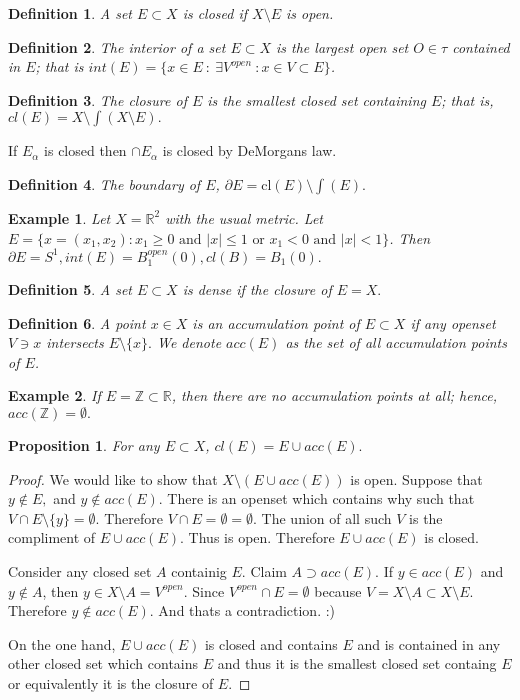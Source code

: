 \documentclass[letter]{article}
\newtheorem{example}{Example}
\newtheorem{definition}{Definition}
\newtheorem{proposition}{Proposition}
\def\cl{\text{cl}}
\begin{document}
\begin{definition}
	A set $E \subset X$ is closed if $X \setminus E$ is open.
\end{definition}
\begin{definition}
	The interior of a set $E \subset X$ is the largest open set $O \in \tau$ contained in $E$;
	that is $int(E) = \{x \in E\ :\ \exists V^{open}\ : x \in V \subset E\}$.
\end{definition}
\begin{definition}
	The closure of $E$ is the smallest closed set containing $E$; that is,
	$cl(E) = X \setminus \int(X \setminus E).$
\end{definition}
If $E_\alpha$ is closed then $\cap E_\alpha $ is closed by DeMorgans law.
\begin{definition}
	The boundary of $E$, $\partial E = \cl(E) \setminus \int(E).$
\end{definition}
\begin{example}
	Let $X = \mathbb{R}^2$ with the usual metric. Let $E = \{x = (x_1, x_2): x_1 \geq 0 \text{ and } |x| \leq 1 \text{ or } x_1 < 0 \text{ and } |x| < 1 \}$. Then $\partial E = S^1, int(E) = B^{open}_1(0), cl(B) = B_1(0).$
\end{example}
\begin{definition}
	A set $E \subset X$ is dense if the closure of $E = X.$
\end{definition}
\begin{definition}
	A point $x \in X$ is an accumulation point of $E \subset X$ if any openset $V \ni x$
	intersects $E \setminus \{x\}.$ We denote $acc(E)$ as the set of all accumulation points of $E$.
\end{definition}
\begin{example}
 If $E = \mathbb{Z} \subset \mathbb{R}$, then there are no accumulation points at all; hence, $acc(\mathbb{Z}) = \emptyset.$
\end{example}
\begin{proposition}
	For any $E \subset X$, $cl(E) = E \cup acc(E).$
\end{proposition}
\begin{proof}
	We would like to show that $X \setminus (E \cup acc(E))$ is open.
	Suppose that $y \notin E,$ and $y \notin acc(E)$. There is an openset which
	contains why such that $V \cap E \setminus \{y\} = \emptyset.$ Therefore $V \cap E = \emptyset = \emptyset$.
	The union of all such $V$ is the compliment of $E \cup acc(E).$ Thus is open. Therefore $E \cup acc(E)$ is closed.

	Consider any closed set $A$ containig $E$. Claim $A \supset acc(E).$ If $y \in acc(E)$ and $y \notin A$,
	then $y \in X \setminus A = V^{open}.$ Since $V^{open} \cap E = \emptyset$ because $V = X \setminus A \subset X \setminus E.$ Therefore $y \notin acc(E).$ And thats a contradiction. :)

	On the one hand, $E \cup acc(E)$ is closed  and contains $E$ and is contained in any other closed
	set which contains $E$ and thus it is the smallest closed set containg $E$ or equivalently it is the closure of $E.$
\end{proof}
\end{document}
